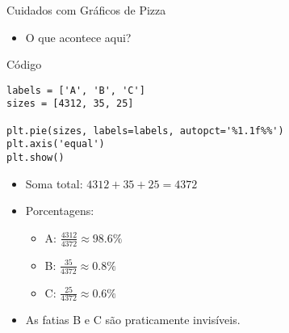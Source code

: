 \begin{frame}[fragile]{Cuidados com Gráficos de Pizza}
    \begin{itemize}
        \item O que acontece aqui?
    \end{itemize}

    \begin{block}{Código}
\begin{verbatim}
labels = ['A', 'B', 'C']
sizes = [4312, 35, 25]

plt.pie(sizes, labels=labels, autopct='%1.1f%%')
plt.axis('equal')
plt.show()
\end{verbatim}
    \end{block}

    \begin{itemize}
        \item Soma total: $4312 + 35 + 25 = 4372$
        \item Porcentagens:
        \begin{itemize}
            \item A: $\frac{4312}{4372} \approx 98.6\%$
            \item B: $\frac{35}{4372} \approx 0.8\%$
            \item C: $\frac{25}{4372} \approx 0.6\%$
        \end{itemize}
        \item As fatias B e C são praticamente invisíveis.

    \end{itemize}
\end{frame}

